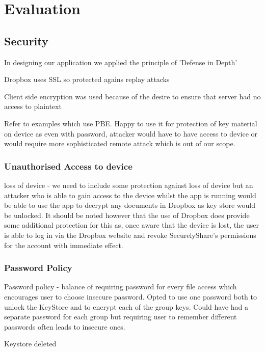 
\chapter{Evaluation}
\label{cha:eval}
\section{Security}
\label{sec:security}
In designing our application we applied the principle of 'Defense in Depth' \citep{nsa}

 Dropbox uses SSL so protected agains replay attacks
 
 Client side encryption was used because of the desire to ensure that server had no access to plaintext

Refer to examples which use PBE.  Happy to use it for protection of key material on device as even with password, attacker would have to have access to device or would require more sophisticated remote attack which is out of our scope. 



\subsection*{Unauthorised Access to device}
loss of device - we need to include some protection against loss of device but an attacker who is able to gain access to the device whilst the app is running would be able to use the app to decrypt any documents in Dropbox as key store would be unlocked.  It should be noted however that the use of Dropbox does provide some additional protection for this as, once aware that the device is lost, the user is able to log in via the Dropbox website and revoke SecurelyShare's permissions for the account with immediate effect. 

\subsection*{Password Policy}
Password policy - balance of requiring password for every file access which encourages user to choose insecure password.  Opted to use one password both to unlock the KeyStore and to encrypt each of the group keys.  Could have had a separate password for each group but requiring user to remember different passwords often leads to insecure ones. 

Keystore deleted


